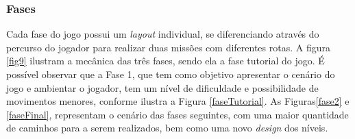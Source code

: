 \documentclass[10pt, conference, compsocconf]{IEEEtran}
\begin{document}

\subsubsection{Fases}\label{GDD}
Cada fase do jogo possui um \textit{layout} individual, se diferenciando através do percurso do jogador para realizar duas missões com diferentes rotas. A figura \ref{fig9} ilustram a mecânica das três fases, sendo ela a fase tutorial do jogo. É possível observar que a Fase 1, que tem como objetivo apresentar o cenário do jogo e ambientar o jogador, tem um nível de dificuldade e possibilidade de movimentos menores, conforme ilustra a Figura \ref{faseTutorial}. As Figuras\ref{fase2} e \ref{faseFinal}, representam o cenário das fases seguintes, com uma maior quantidade de caminhos para a serem realizados, bem como uma novo \textit{design} dos níveis.
\end{document}
